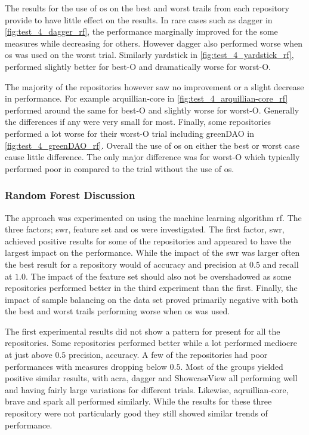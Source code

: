 The results for the use of \gls{os} on the best and worst trails from each repository provide to have little effect on the results. In rare cases such as dagger in \autoref{fig:test_4_dagger_rf}, the performance marginally improved for the some measures while decreasing for others. However dagger also performed worse when \gls{os} was used on the worst trial. Similarly yardstick in \autoref{fig:test_4_yardstick_rf}, performed slightly better for best-O and dramatically worse for worst-O.

The majority of the repositories however saw no improvement or a slight decrease in performance. For example arquillian-core in \autoref{fig:test_4_arquillian-core_rf} performed around the same for best-O and slightly worse for worst-O. Generally the differences if any were very small for most. Finally, some repositories performed a lot worse for their worst-O trial including greenDAO in \autoref{fig:test_4_greenDAO_rf}. Overall the use of \gls{os} on either the best or worst case cause little difference. The only major difference was for worst-O which typically performed poor in compared to the trial without the use of \gls{os}.

\subsubsection{Random Forest Discussion}
\label{subsec:rf_discussion}

The approach was experimented on using the machine learning algorithm \gls{rf}. The three factors; \gls{swr}, feature set and \gls{os} were investigated. The first factor, \gls{swr}, achieved positive results for some of the repositories and appeared to have the largest impact on the performance. While the impact of the \gls{swr} was larger often the best result for a repository would of accuracy and precision at $0.5$ and recall at $1.0$. The impact of the feature set should also not be overshadowed as some repositories performed better in the third experiment than the first. Finally, the impact of sample balancing on the data set proved primarily negative with both the best and worst trails performing worse when \gls{os} was used.

The first experimental results did not show a pattern for present for all the repositories. Some repositories performed better while a lot performed mediocre at just above $0.5$ precision, accuracy. A few of the repositories had poor performances with measures dropping below $0.5$. Most of the groups yielded positive similar results, with acra, dagger and ShowcaseView all performing well and having fairly large variations for different trials. Likewise, aqruillian-core, brave and spark all performed similarly. While the results for these three repository were not particularly good they still showed similar trends of performance.

